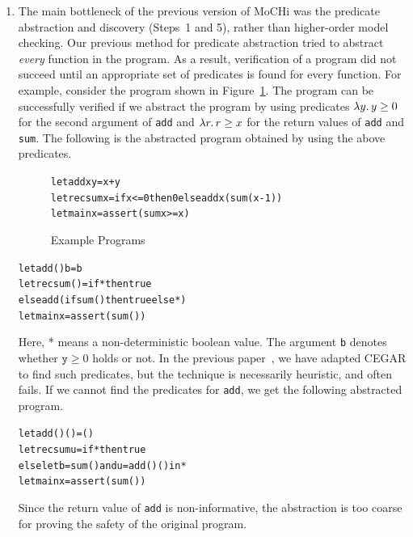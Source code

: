 \begin{enumerate}
\item The main bottleneck of the previous version of MoCHi was the
      predicate abstraction and discovery (Steps~1 and 5), rather than
      higher-order model checking.  Our previous method for predicate
      abstraction tried to abstract \emph{every} function in the
      program. As a result, verification of a program did not succeed
      until an appropriate set of predicates is found for every
      function.  For example, consider the program shown in
      Figure~\ref{fig:sum}.  The program can be successfully verified if
      we abstract the program by using predicates $\lambda{y}.\,{y \geq 0}$
      for the second argument of \texttt{add} and $\lambda{r}.\,{r \geq x}$
      for the return values of \texttt{add} and \texttt{sum}.  The
      following is the abstracted program obtained
  by using the above predicates.
\begin{figure}[t]
\vspace{-5pt}
\begin{alltt}
 let add x y = x + y
 letrec sum x = if x<=0 then 0 else add x (sum(x-1))
 let main x = assert (sum x >= x)
\end{alltt}
\vspace{-5pt}
\caption{Example Programs}
\label{fig:sum}
\end{figure}
\vspace{-5pt}
\begin{alltt}
 let add () b = b
 letrec sum () = if * then true
   else add (if sum () then true else *)
 let main x = assert (sum ())
\end{alltt}
\vspace{-5pt}
      Here, * means a non-deterministic boolean value.  The argument
      \texttt{b} denotes whether $\mathtt{y} \geq 0$ holds or not.
      In the previous paper~\cite{KobayashiPLDI2011}, we have adapted
      CEGAR to find such predicates, but the technique is necessarily
      heuristic, and often fails.  If we cannot find the
      predicates for \texttt{add}, we get the following abstracted
      program.
\vspace{-5pt}
\begin{alltt}
 let add () () = ()
 letrec sum u = if * then true
   else let b = sum () and u = add () () in *
 let main x = assert (sum ())
\end{alltt}
\vspace{-5pt}
      Since the return value of \texttt{add} is non-informative, the
      abstraction is too coarse for proving the safety of the original program.


\end{enumerate}
